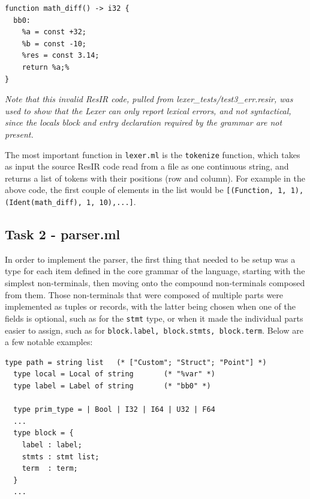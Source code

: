 \documentclass[11pt, a4paper]{article}
\begin{document}
\begin{lstlisting}[language={[Objective]Caml}]
function math_diff() -> i32 {
  bb0:
    %a = const +32;
    %b = const -10;
    %res = const 3.14;
    return %a;%
}
\end{lstlisting}
\vspace{-0.5cm}
\begin{center}
    \textit{\footnotesize Note that this invalid ResIR code, pulled from lexer\_tests/test3\_err.resir, was used to show that the Lexer can only report lexical errors, and 
        not syntactical, since the locals block and entry declaration required by the grammar are not present.}
\end{center}

\medskip

The most important function in \texttt{lexer.ml} is the \texttt{tokenize} function, which takes as input the source ResIR code read from a file
as one continuous string, and returns a list of tokens with their positions (row and column). For example in the above code, the first couple of elements in the list would be
\texttt{[(Function, 1, 1), (Ident(math\_diff), 1, 10),...]}.

\subsection{Task 2 - parser.ml}
In order to implement the parser, the first thing that needed to be setup was a type for each item defined in the core grammar of the language, 
starting with the simplest non-terminals, then moving onto the compound non-terminals composed from them. Those non-terminals that were composed of 
multiple parts were implemented as tuples or records, with the latter being chosen when one of the fields is optional, such as for the \texttt{stmt} type, 
or when it made the individual parts easier to assign, such as for \texttt{block.label, block.stmts, block.term}. 
Below are a few notable examples:

\medskip

\begin{lstlisting}[language={[Objective]Caml}]
  type path = string list   (* ["Custom"; "Struct"; "Point"] *)
  type local = Local of string       (* "%var" *)
  type label = Label of string       (* "bb0" *)

  type prim_type = | Bool | I32 | I64 | U32 | F64
  ...
  type block = {
    label : label;
    stmts : stmt list;
    term  : term;
  }
  ...
\end{lstlisting}
\end{document}
